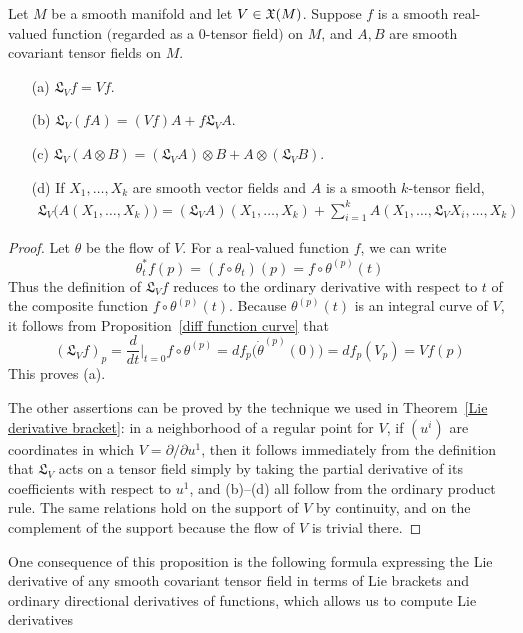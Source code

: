 \begin{proposition}\label{tensor Lie derivative prop}
Let $M$ be a smooth manifold and let $V\in\mathfrak{X}(M)$. Suppose $f$ is a smooth real-valued function $($regarded as a $0$-tensor field$)$ on $M$, and $A,B$ are smooth covariant tensor fields on $M$.
\begin{itemize}
\item[(a)] $\mathfrak{L}_Vf=Vf$.
\item[(b)] $\mathfrak{L}_V(fA)=(Vf)A+f\mathfrak{L}_VA$.
\item[(c)] $\mathfrak{L}_V(A\otimes B)=(\mathfrak{L}_VA)\otimes B+A\otimes(\mathfrak{L}_VB)$.
\item[(d)] If $X_1,\dots,X_k$ are smooth vector fields and $A$ is a smooth $k$-tensor field,
\begin{align*}
\mathfrak{L}_V\big(A(X_1,\dots,X_k)\big)=(\mathfrak{L}_VA)(X_1,\dots,X_k)+\sum_{i=1}^{k}A(X_1,\dots,\mathfrak{L}_VX_i,\dots,X_k)
\end{align*}
\end{itemize}
\end{proposition}
\begin{proof}
Let $\theta$ be the flow of $V$. For a real-valued function $f$, we can write
\[\theta^*_tf(p)=(f\circ\theta_t)(p)=f\circ\theta^{(p)}(t)\]
Thus the definition of $\mathfrak{L}_Vf$ reduces to the ordinary derivative with respect to $t$ of the composite function $f\circ\theta^{(p)}(t)$. Because $\theta^{(p)}(t)$ is an integral curve of $V$, it follows from Proposition~\ref{diff function curve} that
\[(\mathfrak{L}_Vf)_p=\frac{d}{dt}\Big|_{t=0}f\circ\theta^{(p)}=df_p\big(\dot{\theta}^{(p)}(0)\big)=df_p(V_p)=Vf(p)\]
This proves (a).\par
The other assertions can be proved by the technique we used in Theorem~\ref{Lie derivative bracket}: in a neighborhood of a regular point for $V$, if $(u^i)$ are coordinates in which $V=\partial/\partial u^1$, then it follows immediately from the definition that $\mathfrak{L}_V$ acts on a tensor field simply by taking the partial derivative of its coefficients with respect to $u^1$, and (b)--(d) all follow from the ordinary product rule. The same relations hold on the support of $V$ by continuity, and on the complement of the support because the flow of $V$ is trivial there.
\end{proof}
One consequence of this proposition is the following formula expressing the Lie
derivative of any smooth covariant tensor field in terms of Lie brackets and ordinary
directional derivatives of functions, which allows us to compute Lie derivatives
